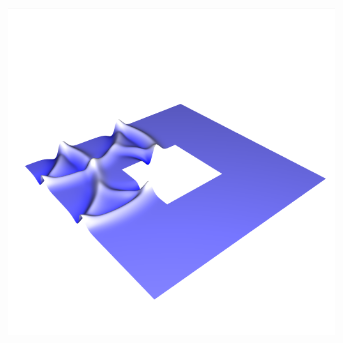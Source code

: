 \documentclass[crop=false,10pt,ngerman]{standalone}
\begin{document}
\begin{figure}[p]
\begin{subfigure}[b]{0.24\textwidth}
          \caption{}
        \end{subfigure}
        \begin{subfigure}[b]{0.24\textwidth}
          \center
          \includegraphics[trim={0.9cm 1.8cm 0.5cm 5cm},clip,width=0.95\textwidth]{images/ring_wave_3.png}
          \caption{}
        \end{subfigure}


\end{figure}
\end{document}
